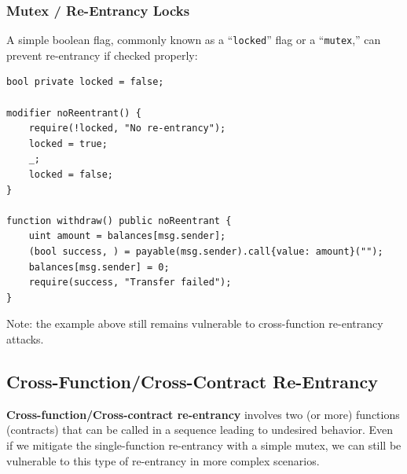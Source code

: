 \documentclass[12pt]{article}
\newcommand{\codeinline}[1]{\texttt{#1}}
\begin{document}
\subsubsection*{Mutex / Re-Entrancy Locks}

A simple boolean flag, commonly known as a “\codeinline{locked}” flag or a “\codeinline{mutex},” can prevent re-entrancy if checked properly:

\begin{lstlisting}[language=Solidity]
bool private locked = false;

modifier noReentrant() {
    require(!locked, "No re-entrancy");
    locked = true;
    _;
    locked = false;
}

function withdraw() public noReentrant {
    uint amount = balances[msg.sender];
    (bool success, ) = payable(msg.sender).call{value: amount}("");
    balances[msg.sender] = 0;
    require(success, "Transfer failed");
}
\end{lstlisting}

\noindent
Note: the example above still remains vulnerable to cross-function re-entrancy attacks.

\subsection{Cross-Function/Cross-Contract Re-Entrancy}

\textbf{Cross-function/Cross-contract re-entrancy} involves two (or more) functions (contracts) that can be called in a sequence leading to undesired behavior. Even if we mitigate the single-function re-entrancy with a simple mutex, we can still be vulnerable to this type of re-entrancy in more complex scenarios.
\end{document}
